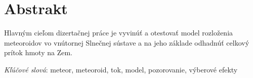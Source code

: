 \section*{Abstrakt}
    Hlavným cieľom dizertačnej práce je vyvinúť a otestovať model rozloženia meteoroidov
    vo vnútornej Slnečnej sústave a na jeho základe odhadnúť celkový prítok hmoty na Zem.

    \emph{Kľúčové slová}: meteor, meteoroid, tok, model, pozorovanie, výberové efekty

